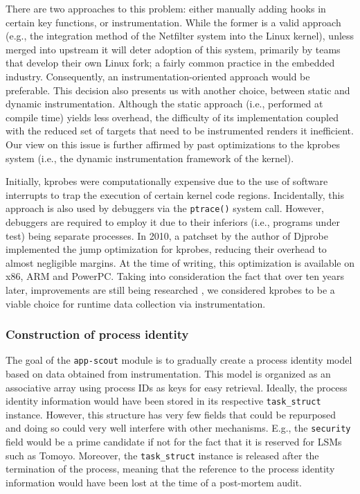 There are two approaches to this problem: either manually adding hooks in
certain key functions, or instrumentation. While the former is a valid approach
(e.g., the integration method of the Netfilter system into the Linux kernel),
unless merged into upstream it will deter adoption of this system, primarily by
teams that develop their own Linux fork; a fairly common practice in the
embedded industry. Consequently, an instrumentation-oriented approach would be
preferable. This decision also presents us with another choice, between static
and dynamic instrumentation. Although the static approach (i.e., performed at
compile time) yields less overhead, the difficulty of its implementation coupled
with the reduced set of targets that need to be instrumented renders it
inefficient. Our view on this issue is further affirmed by past optimizations to
the kprobes system (i.e., the dynamic instrumentation framework of the kernel).

Initially, kprobes were computationally expensive due to the use of software
interrupts to trap the execution of certain kernel code regions. Incidentally,
this approach is also used by debuggers via the \texttt{ptrace()} system call.
However, debuggers are required to employ it due to their inferiors (i.e.,
programs under test) being separate processes. In 2010, a patchset by the author
of Djprobe \cite{hiramatsu2007djprobe} implemented the jump optimization for
kprobes, reducing their overhead to almost negligible margins. At the time of
writing, this optimization is available on x86, ARM and PowerPC. Taking into
consideration the fact that over ten years later, improvements are still being
researched \cite{jia2024fast}, we considered kprobes to be a viable choice for
runtime data collection via instrumentation.


\subsubsection{Construction of process identity}

The goal of the \texttt{app-scout} module is to gradually create a process
identity model based on data obtained from instrumentation. This model is
organized as an associative array using process IDs as keys for easy retrieval.
Ideally, the process identity information would have been stored in its
respective \texttt{task\_struct} instance. However, this structure has very few
fields that could be repurposed and doing so could very well interfere with
other mechanisms. E.g., the \texttt{security} field would be a prime candidate
if not for the fact that it is reserved for LSMs such as Tomoyo. Moreover, the
\texttt{task\_struct} instance is released after the termination of the process,
meaning that the reference to the process identity information would have been
lost at the time of a post-mortem audit.

